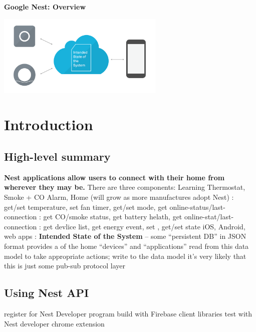 \documentclass{myproc}
\begin{document}
\small


\begin{center}
{\large\bf Google Nest: Overview}
\end{center}

\includegraphics[width=8cm]{pics/intended-state}

\vspace*{1cm}

\tableofcontents


\section{Introduction}
\subsection{High-level summary}
\bit
\w \textcolor{red2}{\bf Nest applications allow users to connect with their
  home from wherever they may be.} 
\w There are three components:
  \bit
  \w {} Learning Thermostat, Smoke + CO Alarm, Home (will
  grow as more manufactures adopt Nest)
       \bit
       \w {}: get/set temperature, set fan timer, get/set mode,
       get online-status/last-connection
       \w {}: get CO/smoke status, get battery helath, get online-stat/last-connection
       \w {}: get devlice list, get energy event, set , get/set
        state 
       \eit
  \w {} iOS, Android, web apps
  \w {}: \textcolor{red2}{\bf Intended State of the System} --
  some ``persistent DB'' in JSON format
      \bit
      \w provides a  of the home
      \w ``devices'' and ``applications'' read from this data model to take
      appropriate actions; write to the data model
      \w \textcolor{blue2}{it's very likely that this is just some pub-sub
        protocol layer}
      \eit
  \eit 
\eit
\subsection{Using Nest API}
\bit
\w register for Nest Developer program
\w build with Firebase client libraries
\w test with Nest developer chrome extension
\eit
\end{document}
